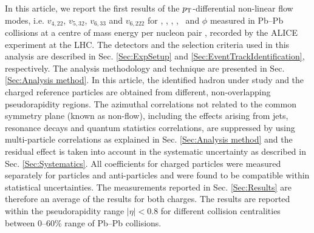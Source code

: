 In this article, we report the first results of the $p_{\rm{T}}$-differential non-linear flow modes, i.e. $v_{4,22}$, $v_{5,32}$, $v_{6,33}$ and $v_{6,222}$ for \pion, \kaon, \Ks, \proton, \lambdas~and $\phi$ measured in Pb--Pb collisions at a centre of mass energy per nucleon pair \sNN, recorded by the ALICE experiment \cite{Aamodt:2008zz} at the LHC. The detectors and the selection criteria used in  this analysis are described in Sec. \ref{Sec:ExpSetup} and \ref{Sec:EventTrackIdentification}, respectively. 
The analysis methodology and technique are presented in Sec. \ref{Sec:Analysis method}. In this article, the identified hadron under study and the charged reference particles are obtained from different, non-overlapping pseudorapidity regions. The azimuthal correlations not related to the common symmetry plane (known as non-flow), including the effects arising from jets, resonance decays and quantum statistics correlations, are suppressed by using multi-particle correlations as explained in Sec. \ref{Sec:Analysis method} and the residual effect is taken into account in the systematic uncertainty as described in Sec. \ref{Sec:Systematics}. All coefficients for charged particles were measured separately for particles and anti-particles and were found to be compatible within statistical uncertainties. The measurements reported in Sec. \ref{Sec:Results} are therefore an average of the results for both charges. The results are reported within the pseudorapidity range $|\eta|<0.8$ for different collision centralities between 0--60\% range of Pb--Pb collisions. 







